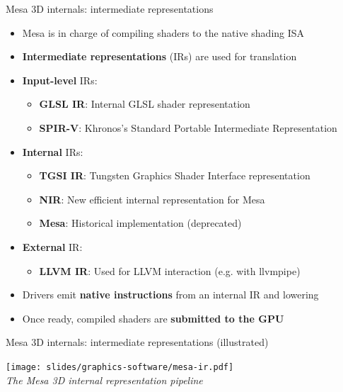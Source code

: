 \begin{frame}{Mesa 3D internals: intermediate representations}
  \begin{itemize}
  \item Mesa is in charge of compiling shaders to the native shading ISA
  \item \textbf{Intermediate representations} (IRs) are used for translation
  \item \textbf{Input-level} IRs:
    \begin{itemize}
    \item \textbf{GLSL IR}: Internal GLSL shader representation
    \item \textbf{SPIR-V}: Khronos's Standard Portable Intermediate Representation
    \end{itemize}
  \item \textbf{Internal} IRs:
    \begin{itemize}
    \item \textbf{TGSI IR}: Tungsten Graphics Shader Interface representation
    \item \textbf{NIR}: New efficient internal representation for Mesa
    \item \textbf{Mesa}: Historical implementation (deprecated)
    \end{itemize}
  \item \textbf{External} IR:
    \begin{itemize}
    \item \textbf{LLVM IR}: Used for LLVM interaction (e.g. with llvmpipe)
    \end{itemize}
  \item Drivers emit \textbf{native instructions} from an internal IR and lowering
  \item Once ready, compiled shaders are \textbf{submitted to the GPU}
  \end{itemize}
\end{frame}

\begin{frame}{Mesa 3D internals: intermediate representations (illustrated)}
  \begin{center}
  \texttt{[image: slides/graphics-software/mesa-ir.pdf]}\\
  \textit{\small The Mesa 3D internal representation pipeline}
  \end{center}
\end{frame}

